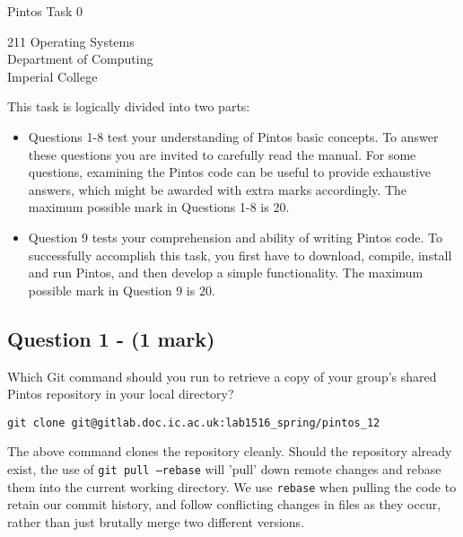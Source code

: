 \documentclass[a4paper,12pt]{article}
\begin{document}
\small

\begin{center}
\begin{LARGE}
Pintos Task 0
\end{LARGE}
\end{center}

\begin{center}
211 Operating Systems \\
Department of Computing \\
Imperial College
\end{center}

This task is logically divided into two parts:
\begin{itemize}
\item Questions 1-8 test your understanding of Pintos basic concepts.
      To answer these questions you are invited to carefully read the manual.
      For some questions, examining the Pintos code can be useful to provide exhaustive answers, which might be awarded with extra marks accordingly.
      The maximum possible mark in Questions 1-8 is 20.

\item Question 9 tests your comprehension and ability of writing Pintos code.
      To successfully accomplish this task, you first have to download, compile, install and run Pintos, and then develop a simple functionality.
      The maximum possible mark in Question 9 is 20.
\end{itemize}

\subsection*{Question 1 - (1 mark)}
Which Git command should you run to retrieve a copy of your group’s shared Pintos repository in your local directory?\\

\begin{verbatim}
git clone git@gitlab.doc.ic.ac.uk:lab1516_spring/pintos_12
\end{verbatim}

The above command clones the repository cleanly. Should the repository already exist, the use of \texttt{git pull --rebase} will 'pull' down remote changes and rebase them into the current working directory. We use \texttt{rebase} when pulling the code to retain our commit history, and follow conflicting changes in files as they occur, rather than just brutally merge two different versions.
\end{document}
